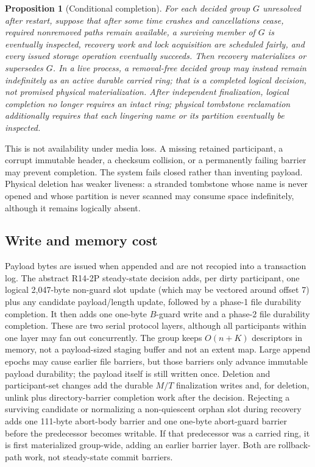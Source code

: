 \documentclass[10pt,twocolumn]{article}
\newtheorem{proposition}{Proposition}
\theoremstyle{remark}
\begin{document}
\begin{proposition}[Conditional completion]
For each decided group $G$ unresolved after restart, suppose that after some time crashes and
cancellations cease, required nonremoved paths remain available, a surviving member of $G$ is
eventually inspected, recovery work and lock acquisition are scheduled fairly, and every issued
storage operation eventually succeeds. Then recovery materializes or supersedes $G$. In a live
process, a removal-free decided group may instead remain indefinitely as an active durable carried
ring; that is a completed logical decision, not promised physical materialization. After independent
finalization, logical completion no longer requires an intact ring; physical tombstone reclamation
additionally requires that each lingering name or its partition eventually be inspected.
\end{proposition}

This is not availability under media loss. A missing retained participant, a corrupt immutable
header, a checksum collision, or a permanently failing barrier may prevent completion. The system
fails closed rather than inventing payload. Physical deletion has weaker liveness: a stranded
tombstone whose name is never opened and whose partition is never scanned may consume space
indefinitely, although it remains logically absent.

\subsection{Write and memory cost}

Payload bytes are issued when appended and are not recopied into a transaction log. The abstract
R14-2P steady-state decision adds, per dirty participant, one logical 2,047-byte non-guard slot
update (which may be vectored around offset 7) plus any candidate payload/length update, followed by
a phase-1 file durability completion. It then adds one one-byte $B$-guard write and a phase-2 file
durability completion. These are two serial protocol layers, although all participants within one
layer may fan out concurrently. The group keeps $O(n+K)$ descriptors in memory, not a payload-sized
staging buffer and not an extent map. Large append epochs may cause earlier file barriers, but those
barriers only advance immutable payload durability; the payload itself is still written once.
Deletion and participant-set changes add the durable $M/T$ finalization writes and, for deletion,
unlink plus directory-barrier completion work after the decision.
Rejecting a surviving candidate or normalizing a non-quiescent orphan slot during recovery adds one
111-byte abort-body barrier and one one-byte abort-guard barrier before the predecessor becomes
writable. If that predecessor was a carried ring, it is first materialized
group-wide, adding an earlier barrier layer. Both are rollback-path work, not steady-state commit
barriers.
\end{document}
